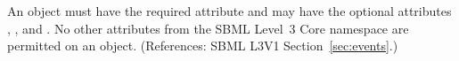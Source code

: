 An \EventAssignment object must have the required attribute
 and may have the optional attributes , ,  and
.  No other attributes from the SBML Level~3 Core namespace
are permitted on an \EventAssignment object.  (References: SBML L3V1
Section~\ref{sec:events}.)
